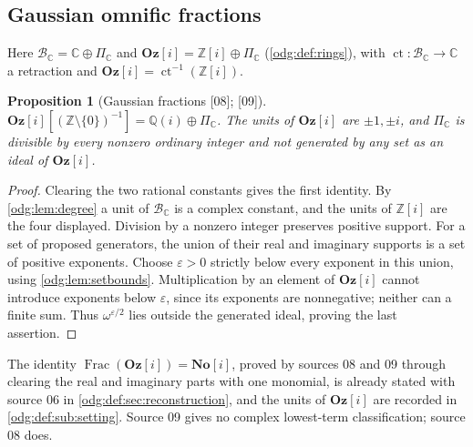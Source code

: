 \documentclass[11pt,oneside]{article}
\numberwithin{equation}{section}
\newtheorem{proposition}[proposition]{Proposition}
\theoremstyle{definition}
\theoremstyle{remark}
\newcommand{\No}{\mathbf{No}}
\newcommand{\Oz}{\mathbf{Oz}}
\newcommand{\Z}{\mathbb Z}
\newcommand{\Q}{\mathbb Q}
\newcommand{\C}{\mathbb C}
\newcommand{\BC}{\mathcal B_{\C}}
\newcommand{\ct}{\operatorname{ct}}
\newcommand{\Frac}{\operatorname{Frac}}
\newcommand{\src}[1]{\textup{\textsf{\small[#1]}}}
\newcommand{\Og}{\Oz[i]}
\begin{document}
\subsection{Gaussian omnific fractions}\label{odg:frac:sub:gaussian}

Here $\BC=\C\oplus\Pi_{\C}$ and $\Og=\Z[i]\oplus\Pi_{\C}$ (\cref{odg:def:rings}),
with $\ct:\BC\to\C$ a retraction and $\Og=\ct^{-1}(\Z[i])$.

\begin{proposition}[Gaussian fractions \src{08}; \src{09}]\label{odg:frac:prop:gaussianfrac}
$\Og[(\Z\setminus\{0\})^{-1}]=\Q(i)\oplus\Pi_{\C}$. The units of $\Og$ are
$\pm1,\pm i$, and $\Pi_{\C}$ is divisible by every nonzero ordinary integer and
not generated by any set as an ideal of $\Og$.
\end{proposition}
\begin{proof}
Clearing the two rational constants gives the first identity. By
\cref{odg:lem:degree} a unit of $\BC$ is a complex constant, and the units of
$\Z[i]$ are the four displayed. Division by a nonzero integer preserves
positive support. For a set of proposed generators, the union of their
real and imaginary supports is a set of positive exponents. Choose
$\varepsilon>0$ strictly below every exponent in this union, using
\cref{odg:lem:setbounds}. Multiplication by an element of $\Og$ cannot
introduce exponents below $\varepsilon$, since its exponents are
nonnegative; neither can a finite sum. Thus $\omega^{\varepsilon/2}$
lies outside the generated ideal, proving the last assertion.
\end{proof}

The identity $\Frac(\Og)=\No[i]$, proved by sources 08 and 09 through clearing
the real and imaginary parts with one monomial, is already stated with
source 06 in \cref{odg:def:sec:reconstruction}, and the units of $\Og$ are
recorded in \cref{odg:def:sub:setting}. Source 09 gives no complex lowest-term
classification; source 08 does.
\end{document}
